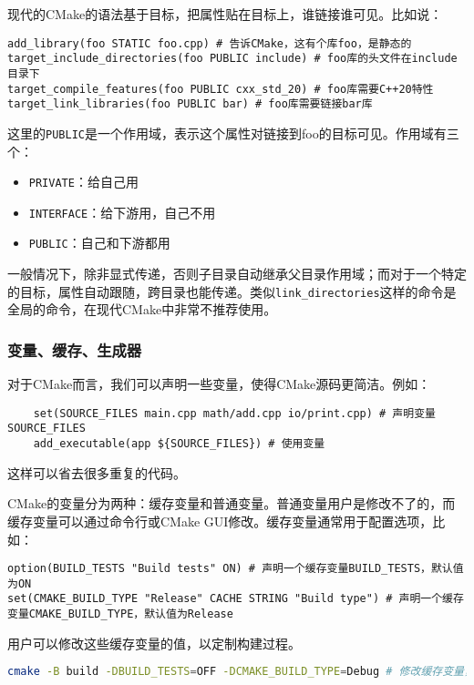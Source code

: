 \documentclass[../main.tex]{subfiles}
\begin{document}
现代的CMake的语法基于目标，把属性贴在目标上，谁链接谁可见。比如说：
\begin{lstlisting}
add_library(foo STATIC foo.cpp) # 告诉CMake，这有个库foo，是静态的
target_include_directories(foo PUBLIC include) # foo库的头文件在include目录下
target_compile_features(foo PUBLIC cxx_std_20) # foo库需要C++20特性
target_link_libraries(foo PUBLIC bar) # foo库需要链接bar库
\end{lstlisting}

这里的\texttt{PUBLIC}是一个作用域，表示这个属性对链接到foo的目标可见。作用域有三个：
\begin{itemize}
  \item \texttt{PRIVATE}：给自己用
  \item \texttt{INTERFACE}：给下游用，自己不用
  \item \texttt{PUBLIC}：自己和下游都用
\end{itemize}

一般情况下，除非显式传递，否则子目录自动继承父目录作用域；而对于一个特定的目标，属性自动跟随，跨目录也能传递。类似\texttt{link\_directories}这样的命令是全局的命令，在现代CMake中非常不推荐使用。

\subsubsection{变量、缓存、生成器}

对于CMake而言，我们可以声明一些变量，使得CMake源码更简洁。例如：
\begin{lstlisting}
    set(SOURCE_FILES main.cpp math/add.cpp io/print.cpp) # 声明变量SOURCE_FILES
    add_executable(app ${SOURCE_FILES}) # 使用变量
\end{lstlisting}
这样可以省去很多重复的代码。

CMake的变量分为两种：缓存变量和普通变量。普通变量用户是修改不了的，而缓存变量可以通过命令行或CMake GUI修改。缓存变量通常用于配置选项，比如：
\begin{lstlisting}
option(BUILD_TESTS "Build tests" ON) # 声明一个缓存变量BUILD_TESTS，默认值为ON
set(CMAKE_BUILD_TYPE "Release" CACHE STRING "Build type") # 声明一个缓存变量CMAKE_BUILD_TYPE，默认值为Release
\end{lstlisting}

用户可以修改这些缓存变量的值，以定制构建过程。
\begin{lstlisting}[language=bash]
cmake -B build -DBUILD_TESTS=OFF -DCMAKE_BUILD_TYPE=Debug # 修改缓存变量，将BUILD_TESTS设置为OFF，将CMAKE_BUILD_TYPE设置为Debug
\end{lstlisting}
\end{document}
